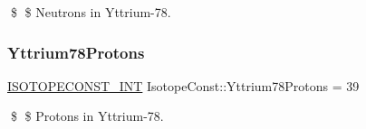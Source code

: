 \$ \$ Neutrons in Yttrium-\/78. \mbox{\label{group___isotope_const-_yttrium-_y78_ga2beb5e8419ea8bddf4216474f9b68eec}} 
\subsubsection{\texorpdfstring{Yttrium78\+Protons}{Yttrium78Protons}}
{\footnotesize\ttfamily \mbox{\hyperlink{group___isotope_const-_macros_ga5f18360b3e99483a35c32d789e62621c}{I\+S\+O\+T\+O\+P\+E\+C\+O\+N\+S\+T\+\_\+\+I\+NT}} Isotope\+Const\+::\+Yttrium78\+Protons = 39}

\$ \$ Protons in Yttrium-\/78. 
